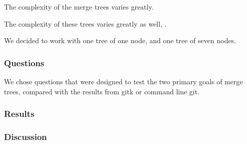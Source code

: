 The complexity of the merge trees varies greatly.

The complexity of these trees varies greatly as well, . %



We decided to work with one tree of one node, and one tree of seven nodes.

\subsubsection{Questions}
\label{ssub:questions}

We chose questions that were designed to test the two primary goals of merge trees,
compared with the results from gitk or command line git. 

\subsubsection{Results}
\label{ssub:results}

\subsubsection{Discussion}
\label{ssub:discussion}


